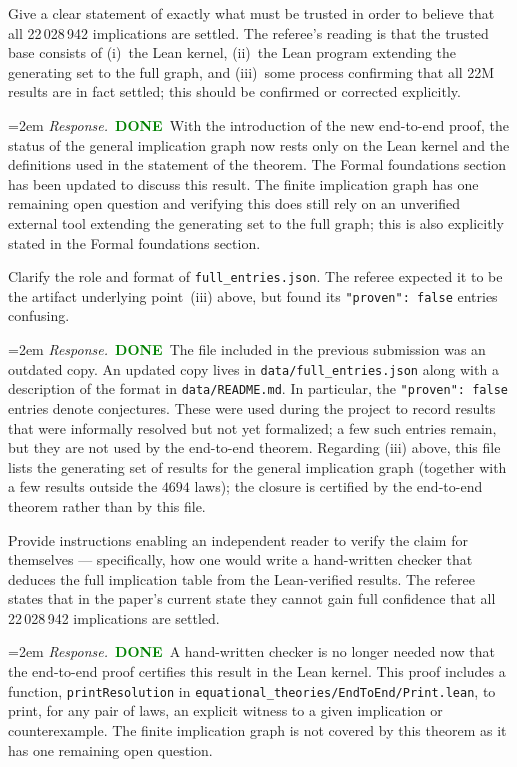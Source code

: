 \documentclass[11pt]{amsart}
\newcommand{\done}{\textcolor{green}{\textbf{DONE}}}
\newcommand{\response}[1]{%
  \par\smallskip
  \noindent\hangindent=2em\hangafter=1
  \textit{Response.}\ #1
  \par\smallskip}
\begin{document}
\begin{requests}
\item Give a clear statement of exactly what must be trusted in order to believe that
all 22\,028\,942 implications are settled. The referee's reading is that the trusted
base consists of (i)~the Lean kernel, (ii)~the Lean program extending the generating
set to the full graph, and (iii)~some process confirming that all 22M results are in
fact settled; this should be confirmed or corrected explicitly.
\response{\done\ With the introduction of the new end-to-end proof, the status of the general implication graph now rests only on the Lean kernel and the definitions used in the statement of the theorem.  The Formal foundations section has been updated to discuss this result.  The finite implication graph has one remaining open question and verifying this does still rely on an unverified external tool extending the generating set to the full graph; this is also explicitly stated in the Formal foundations section.}

\item Clarify the role and format of \texttt{full\_entries.json}. The referee expected
it to be the artifact underlying point~(iii) above, but found its
\texttt{"proven": false} entries confusing.
\response{\done\ The file included in the previous submission was an outdated copy. An updated copy lives in \texttt{data/full\_entries.json} along with a description of the format in \texttt{data/README.md}. In particular, the \texttt{"proven": false} entries denote conjectures.  These were used during the project to record results that were informally resolved but not yet formalized; a few such entries remain, but they are not used by the end-to-end theorem. Regarding (iii) above, this file lists the generating set of results for the general implication graph (together with a few results outside the $4694$ laws); the closure is certified by the end-to-end theorem rather than by this file.}

\item Provide instructions enabling an independent reader to verify the claim for
themselves --- specifically, how one would write a hand-written checker that deduces
the full implication table from the Lean-verified results. The referee states that in
the paper's current state they cannot gain full confidence that all 22\,028\,942
implications are settled.
\response{\done\ A hand-written checker is no longer needed now that the end-to-end proof certifies this result in the Lean kernel.  This proof includes a function, \texttt{printResolution} in \texttt{equational\_theories/EndToEnd/Print.lean}, to print, for any pair of laws, an explicit witness to a given implication or counterexample.  The finite implication graph is not covered by this theorem as it has one remaining open question.}


\end{requests}
\end{document}

